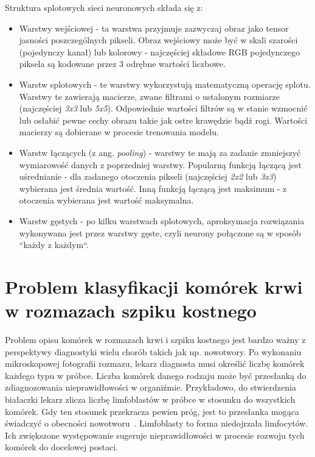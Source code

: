 Struktura splotowych sieci neuronowych składa się z:
\begin{itemize}
    \item Warstwy wejściowej - ta warstwa przyjmuje zazwyczaj obraz jako tensor jasności poszczególnych pikseli.
    Obraz wejściowy może być w skali szarości (pojedynczy kanał) lub kolorowy - najczęściej składowe RGB pojedynczego piksela są kodowane przez 3 odrębne wartości liczbowe.
    \item Warstw splotowych - te warstwy wykorzystują matematyczną operację splotu.
    Warstwy te zawierają macierze, zwane filtrami o ustalonym rozmiarze (najczęściej \textit{3x3} lub \textit{5x5}).
    Odpowiednie wartości filtrów są w stanie wzmocnić lub osłabić pewne cechy obrazu takie jak ostre krawędzie bądź rogi.
    Wartości macierzy są dobierane w procesie trenowania modelu.
    \item Warstw łączących (z ang. \textit{pooling}) - warstwy te mają za zadanie zmniejszyć wymiarowość danych z poprzedniej warstwy.
    Popularną funkcją łączącą jest uśrednianie - dla zadanego otoczenia pikseli (najczęściej \textit{2x2} lub \textit{3x3}) wybierana jest średnia wartość.
    Inną funkcją łączącą jest maksimum - z otoczenia wybierana jest wartość maksymalna.
    \item Warstw gęstych - po kilku warstwach splotowych, aproksymacja rozwiązania wykonywana jest przez warstwy gęste, czyli neurony połączone są w sposób “każdy z każdym“.
\end{itemize}


\section{Problem klasyfikacji komórek krwi w rozmazach szpiku kostnego}

Problem opisu komórek w rozmazach krwi i szpiku kostnego jest bardzo ważny z perspektywy diagnostyki wielu chorób takich jak np.
nowotwory.
Po wykonaniu mikroskopowej fotografii rozmazu, lekarz diagnosta musi określić liczbę komórek każdego typu w próbce.
Liczba komórek danego rodzaju może być przesłanką do zdiagnozowania nieprawidłowości w organiźmie.
Przykładowo, do stwierdzenia białaczki lekarz zlicza liczbę limfoblastów w próbce w stosunku do wszystkich komórek.
Gdy ten stosunek przekracza pewien próg, jest to przesłanka mogąca świadczyć o obecności nowotworu~\cite{interna}.
Limfoblasty to forma niedojrzała limfocytów.
Ich zwiększone występowanie sugeruje nieprawidłowości w procesie rozwoju tych komórek do docelowej postaci.

